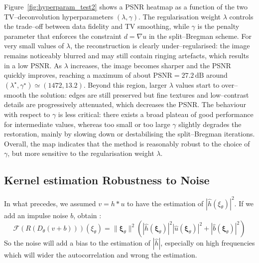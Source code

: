 \documentclass[a4paper,11pt]{article}
\begin{document}
Figure~\ref{fig:hyperparam_test2}  shows a PSNR heatmap as a function of the two TV--deconvolution hyperparameters $(\lambda,\gamma)$. The regularisation weight $\lambda$ controls the trade--off between data fidelity and TV smoothing, while $\gamma$ is the penalty parameter that enforces the constraint $d = \nabla u$ in the split--Bregman scheme. 
For very small values of $\lambda$, the reconstruction is clearly under--regularised: the image remains noticeably blurred and may still contain ringing artefacts, which results in a low PSNR. 
As $\lambda$ increases, the image becomes sharper and the PSNR quickly improves, reaching a maximum of about $\mathrm{PSNR} = 27.2\,\mathrm{dB}$ around $(\lambda^\star, \gamma^\star) \simeq (1472, 13.2)$. 
Beyond this region, larger $\lambda$ values start to over--smooth the solution: edges are still preserved but fine textures and low--contrast details are progressively attenuated, which decreases the PSNR. 
The behaviour with respect to $\gamma$ is less critical: there exists a broad plateau of good performance for intermediate values, whereas too small or too large $\gamma$ slightly degrades the restoration, mainly by slowing down or destabilising the split--Bregman iterations. Overall, the map indicates that the method is reasonably robust to the choice of $\gamma$, but more sensitive to the regularisation weight $\lambda$.


\subsection{Kernel estimation Robustness to Noise}

In what precedes, we assumed $v = h*u$ to have the estimation of $|\hat{h}(\xi_\theta)|^2$. If we add an impulse noise $b$, obtain : 
$$\mathcal{F}(R(D_{\theta}(v+b)))(\xi_\theta) = \|\bm{\xi}_\theta\|^2 (|\hat{h}(\bm{\xi}_\theta)|^2|\hat{u}(\bm{\xi}_\theta)|^2 + |\hat{b}(\bm{\xi}_\theta)|^2)$$
So the noise will add a bias to the estimation of $|\hat{h}|$, especially on high frequencies which will wider the autocorrelation and wrong the estimation.\\
\end{document}
